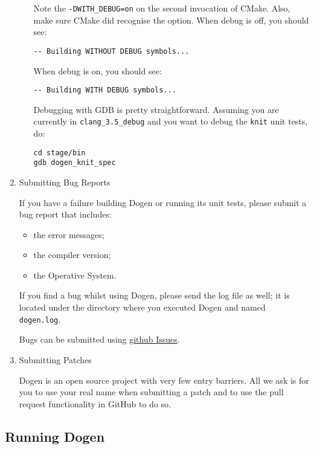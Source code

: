 \documentclass[11pt]{article}
\begin{document}
\begin{enumerate}
\begin{enumerate}
Note the \texttt{-DWITH\_DEBUG=on} on the second invocation of CMake. Also,
make sure CMake did recognise the option. When debug is off, you
should see:

\begin{verbatim}
-- Building WITHOUT DEBUG symbols...
\end{verbatim}

When debug is on, you should see:

\begin{verbatim}
-- Building WITH DEBUG symbols...
\end{verbatim}

Debugging with GDB is pretty straightforward. Assuming you are
currently in \texttt{clang\_3.5\_debug} and you want to debug the \texttt{knit} unit
tests, do:

\begin{verbatim}
cd stage/bin
gdb dogen_knit_spec
\end{verbatim}
\end{enumerate}

\item Submitting Bug Reports
\label{sec-3-1-2-5}

If you have a failure building Dogen or running its unit tests, please
submit a bug report that includes:

\begin{itemize}
\item the error messages;
\item the compiler version;
\item the Operative System.
\end{itemize}

If you find a bug whilst using Dogen, please send the log file as
well; it is located under the directory where you executed Dogen and
named \texttt{dogen.log}.

Bugs can be submitted using \href{https://github.com/kitanda/dogen/issues}{github Issues}.

\item Submitting Patches
\label{sec-3-1-2-6}

Dogen is an open source project with very few entry barriers. All we
ask is for you to use your real name when submitting a patch and to
use the pull request functionality in GitHub to do so.
\end{enumerate}

\subsection{Running Dogen}
\label{sec-3-2}
\end{document}
